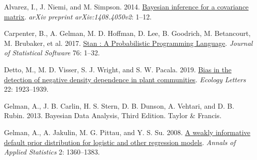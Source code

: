 \documentclass[
  12pt,
  a4paper,
,tablecaptionabove
]{scrartcl}
\newlength{\cslhangindent}
\newenvironment{CSLReferences}[2] %
 {%
  \setlength{\parindent}{0pt}
  \ifodd #1 \everypar{\setlength{\hangindent}{\cslhangindent}}\ignorespaces\fi
  \ifnum #2 > 0
  \setlength{\parskip}{#2\baselineskip}
  \fi
 }%
 {}
\begin{document}
\hypertarget{refs}{}
\begin{CSLReferences}{1}{0}
\leavevmode{}%
Alvarez, I., J. Niemi, and M. Simpson. 2014.
\href{https://doi.org/10.1214/aos/1176348885}{Bayesian inference for a
covariance matrix}. \emph{arXiv preprint arXiv:1408.4050v2}: 1--12.

\leavevmode{}%
Carpenter, B., A. Gelman, M. D. Hoffman, D. Lee, B. Goodrich, M.
Betancourt, M. Brubaker, et al. 2017.
\href{https://doi.org/10.18637/jss.v076.i01}{Stan : {A Probabilistic
Programming Language}}. \emph{Journal of Statistical Software} 76:
1--32.

\leavevmode{}%
Detto, M., M. D. Visser, S. J. Wright, and S. W. Pacala. 2019.
\href{https://doi.org/10.1111/ele.13372}{Bias in the detection of
negative density dependence in plant communities}. \emph{Ecology
Letters} 22: 1923--1939.

\leavevmode{}%
Gelman, A., J. B. Carlin, H. S. Stern, D. B. Dunson, A. Vehtari, and D.
B. Rubin. 2013. Bayesian {Data Analysis}, {Third Edition}. {Taylor \&
Francis}.

\leavevmode{}%
Gelman, A., A. Jakulin, M. G. Pittau, and Y. S. Su. 2008.
\href{https://doi.org/10.1214/08-AOAS191}{A weakly informative default
prior distribution for logistic and other regression models}.
\emph{Annals of Applied Statistics} 2: 1360--1383.

\end{CSLReferences}
\end{document}
